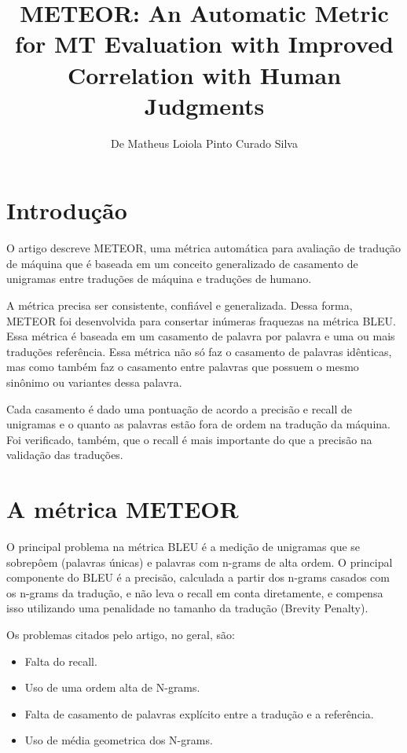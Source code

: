 \documentclass[12pt]{article}
\title{METEOR: An Automatic Metric for MT Evaluation with Improved Correlation with Human Judgments}
\author{De Matheus Loiola Pinto Curado Silva}
\date{}
\begin{document}
	
\maketitle

\section*{Introdução}

O artigo descreve METEOR, uma métrica automática para avaliação de tradução de máquina que é baseada em um conceito generalizado de casamento de unigramas entre traduções de máquina e traduções de humano. 

A métrica precisa ser consistente, confiável e generalizada. Dessa forma, METEOR foi desenvolvida para consertar inúmeras fraquezas na métrica BLEU. Essa métrica é baseada em um casamento de palavra por palavra e uma ou mais traduções referência. Essa métrica não só faz o casamento de palavras idênticas, mas como também faz o casamento entre palavras que possuem o mesmo sinônimo ou variantes dessa palavra.

Cada casamento é dado uma pontuação de acordo a precisão e recall de unigramas e o quanto as palavras estão fora de ordem na tradução da máquina. Foi verificado, também, que o recall é mais importante do que a precisão na validação das traduções.

\section*{A métrica METEOR}

O principal problema na métrica BLEU é a medição de unigramas que se sobrepôem (palavras únicas) e palavras com n-grams de alta ordem. O principal componente do BLEU é a precisão, calculada a partir dos n-grams casados com os n-grams da tradução, e não leva o recall em conta diretamente, e compensa isso utilizando uma penalidade no tamanho da tradução (Brevity Penalty).

Os problemas citados pelo artigo, no geral, são:
\begin{itemize}
    \item Falta do recall.
    \item Uso de uma ordem alta de N-grams.
    \item Falta de casamento de palavras explícito entre a tradução e a referência.
    \item Uso de média geometrica dos N-grams.
\end{itemize}
\end{document}
